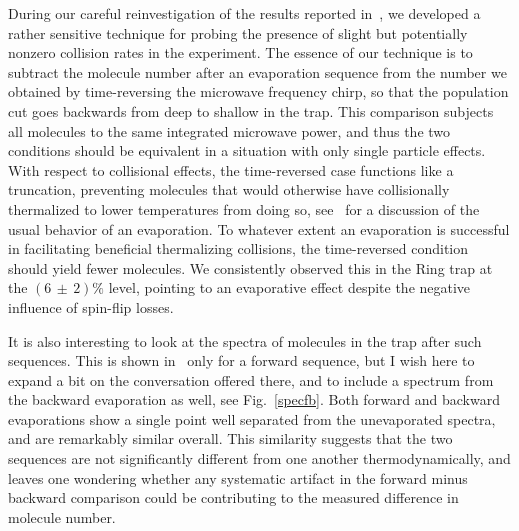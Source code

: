 During our careful reinvestigation of the results reported in~\cite{Stuhl2012evap}, we developed a rather sensitive technique for probing the presence of slight but potentially nonzero collision rates in the experiment.
The essence of our technique is to subtract the molecule number after an evaporation sequence from the number we obtained by time-reversing the  microwave frequency chirp, so that the population cut goes backwards from deep to shallow in the trap.
This comparison subjects all molecules to the same integrated microwave power, and thus the two conditions should be equivalent in a situation with only single particle effects.
With respect to collisional effects, the time-reversed case functions like a truncation, preventing molecules that would otherwise have collisionally thermalized to lower temperatures from doing so, see~\cite{Luiten1996} for a discussion of the usual behavior of an evaporation.
To whatever extent an evaporation is successful in facilitating beneficial thermalizing collisions, the time-reversed condition should yield fewer molecules.
We consistently observed this in the Ring trap at the $(6\,{\pm}\,2)\%$ level, pointing to an evaporative effect despite the negative influence of spin-flip losses.

It is also interesting to look at the spectra of molecules in the trap after such sequences. 
This is shown in~\citep[App.~B]{Reens2017} only for a forward sequence, but I wish here to expand a bit on the conversation offered there, and to include a spectrum from the backward evaporation as well, see Fig.~\ref{specfb}.
Both forward and backward evaporations show a single point well separated from the unevaporated spectra, and are remarkably similar overall.
This similarity suggests that the two sequences are not significantly different from one another thermodynamically, and leaves one wondering whether any systematic artifact in the forward minus backward comparison could be contributing to the measured difference in molecule number.

